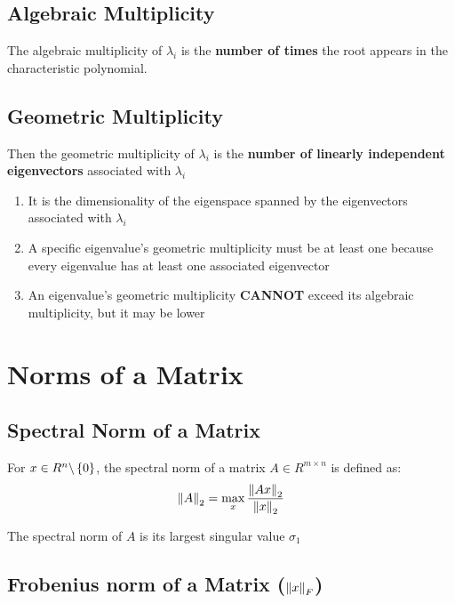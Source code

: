 \subsection{Algebraic Multiplicity}\label{Algebraic Multiplicity}
The algebraic multiplicity of $\lambda_i$ is the \textbf{number of times} the root appears in the characteristic polynomial.


\subsection{Geometric Multiplicity}\label{Geometric Multiplicity}

Then the geometric multiplicity of $\lambda_i$ is the \textbf{number of linearly independent eigenvectors} associated with $\lambda_i$

\begin{enumerate}
    \item It is the dimensionality of the eigenspace spanned by the eigenvectors associated with $\lambda_i$

    \item A specific eigenvalue’s geometric multiplicity must be at least one because every eigenvalue has at least one associated eigenvector

    \item An eigenvalue’s geometric multiplicity \textbf{CANNOT} exceed its algebraic multiplicity, but it may be lower
\end{enumerate}


\section{Norms of a Matrix}\label{Norms of a Matrix}

\subsection{Spectral Norm of a Matrix}\label{Spectral Norm of a Matrix}
For $x \in  R^n\backslash \left\{0\right\}$, the spectral norm of a matrix $A \in  R^{m\times n}$ is defined as:
\[
    \displaystyle
    \left\| A \right\|_2 = \max_x \dfrac{\left\| Ax \right\|_2}{\left\| x \right\|_2}
\]


\begin{theorem}
    The spectral norm of $A$ is its largest singular value $\sigma_1$
\end{theorem}


\subsection{Frobenius norm of a Matrix ($\left\| x \right\|_F$) \cite{wiki/Matrix_norm}}\label{Frobenius norm of a Matrix}


